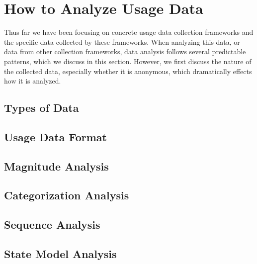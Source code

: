 
\section{How to Analyze Usage Data}

Thus far we have been focusing on concrete usage data collection frameworks and the specific data collected by these frameworks. When analyzing this data, or data from other collection frameworks, data analysis follows several predictable patterns, which we discuss in this section. However, we first discuss the nature of the collected data, especially whether it is anonymous, which dramatically effects how it is analyzed.

\subsection{Types of Data}



\subsection{Usage Data Format}


\subsection{Magnitude Analysis}


\subsection{Categorization Analysis}


\subsection{Sequence Analysis}



\subsection{State Model Analysis}


